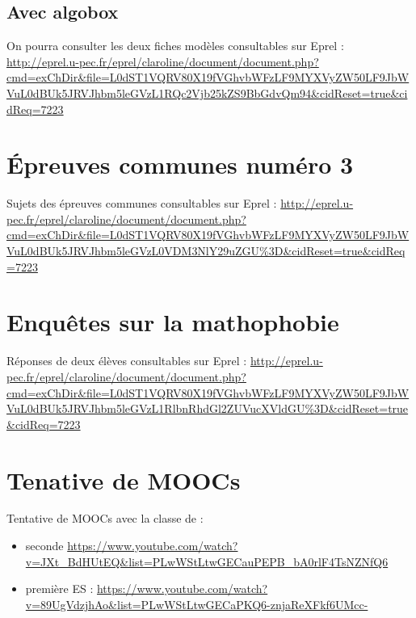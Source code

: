 \section{Avec algobox}

On pourra consulter les deux fiches modèles consultables sur Eprel : 
\url{http://eprel.u-pec.fr/eprel/claroline/document/document.php?cmd=exChDir&file=L0dST1VQRV80X19fVGhvbWFzLF9MYXVyZW50LF9JbWVuL0dBUk5JRVJhbm5leGVzL1RQc2Vjb25kZS9BbGdvQm94\&cidReset=true\&cidReq=7223}

\chapter{\'Epreuves communes numéro 3}

Sujets des épreuves communes consultables sur Eprel : \url{http://eprel.u-pec.fr/eprel/claroline/document/document.php?cmd=exChDir&file=L0dST1VQRV80X19fVGhvbWFzLF9MYXVyZW50LF9JbWVuL0dBUk5JRVJhbm5leGVzL0VDM3NlY29uZGU\%3D\&cidReset=true\&cidReq=7223}

\chapter{Enquêtes sur la mathophobie}

Réponses de deux élèves consultables sur Eprel : \url{http://eprel.u-pec.fr/eprel/claroline/document/document.php?cmd=exChDir&file=L0dST1VQRV80X19fVGhvbWFzLF9MYXVyZW50LF9JbWVuL0dBUk5JRVJhbm5leGVzL1RlbnRhdGl2ZUVucXVldGU\%3D\&cidReset=true\&cidReq=7223}

\chapter{Tenative de MOOCs}

Tentative de MOOCs avec la classe de :
\begin{itemize}
\item seconde \url{https://www.youtube.com/watch?v=JXt_BdHUtEQ\&list=PLwWStLtwGECauPEPB_bA0rlF4TsNZNfQ6}
\item première ES : \url{https://www.youtube.com/watch?v=89UgVdzjhAo\&list=PLwWStLtwGECaPKQ6-znjaReXFkf6UMcc-}
\end{itemize}